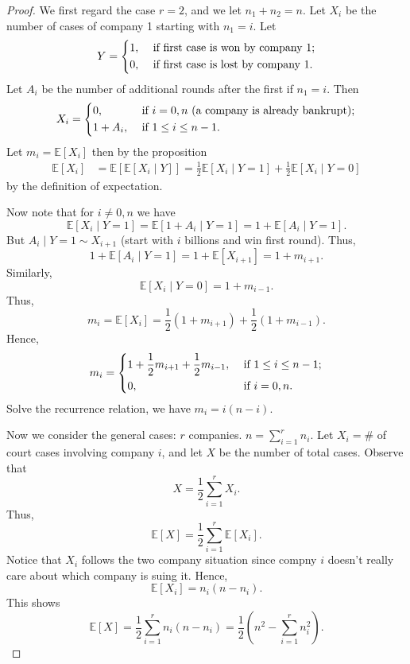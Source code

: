 \begin{proof}
    We first regard the case \(r = 2\), and we let \(n_1 + n_2 = n\). Let \(X_i\) be the number of cases of company 1 starting with \(n_1 = i\). Let 
    \[
        Y = \begin{dcases}
            1, &\text{ if first case is won by company 1}  ;\\
            0, &\text{ if first case is lost by company 1} .
        \end{dcases}
    \]
    Let \(A_i\) be the number of additional rounds after the first if \(n_1 = i\). Then 
    \[
        X_i = \begin{dcases}
            0, &\text{ if } i = 0, n \text{ (a company is already bankrupt)}  ;\\
            1 + A_i, &\text{ if } 1 \le i \le n - 1.
        \end{dcases}
    \]  
    Let \(m_i = \mathbb{E} [X_i]\)  then by the proposition 
    \begin{align*}
        \mathbb{E} [X_i] &= \mathbb{E} \left[ \mathbb{E} [X_i \mid Y] \right] = \frac{1}{2} \mathbb{E} [X_i \mid Y = 1] + \frac{1}{2} \mathbb{E} [X_i \mid Y = 0] 
    \end{align*} 
    by the definition of expectation. 

    Now note that for \(i \neq 0, n\) we have 
    \[
        \mathbb{E} [X_i \mid Y = 1] = \mathbb{E} [1 + A_i \mid Y = 1] = 1 + \mathbb{E} [A_i \mid Y = 1].
    \]
    But \(A_i \mid Y = 1 \sim X_{i + 1}\) (start with \(i\) billions and win first round). Thus,
    \[
        1 + \mathbb{E} [A_i \mid Y = 1] = 1 + \mathbb{E} [X_{i+1}] = 1 + m_{i+1}.
    \] 
    Similarly, 
    \[
        \mathbb{E} [X_i \mid Y = 0] = 1 + m_{i - 1}.
    \]
    Thus,
    \[
        m_i = \mathbb{E} [X_i] = \frac{1}{2} \left( 1 + m_{i + 1} \right) + \frac{1}{2} \left( 1 + m_{i - 1} \right).  
    \]
    Hence, 
    \[
        m_i = \begin{dcases}
            1 + \frac{1}{2} m_{i + 1} + \frac{1}{2} m_{i - 1}, &\text{ if } 1 \le i \le n - 1 ;\\
            0, &\text{ if }  i = 0, n.
        \end{dcases}
    \]
    Solve the recurrence relation, we have \(m_i = i(n - i)\).

    Now we consider the general cases: \(r\) companies. \(n = \sum_{i=1}^r n_i \). Let \(X_i = \#\) of court cases involving company \(i\), and let \(X\) be the number of total cases. Observe that 
    \[
        X = \frac{1}{2} \sum_{i=1}^r X_i. 
    \]      
    Thus,
    \[
        \mathbb{E} [X] = \frac{1}{2} \sum_{i=1}^r \mathbb{E} [X_i]. 
    \]
    Notice that \(X_i\) follows the two company situation since compny \(i\) doesn't really care about which company is suing it. Hence,
    \[
        \mathbb{E} [X_i] = n_i (n - n_i).
    \]  
    This shows 
    \[
        \mathbb{E} [X] = \frac{1}{2} \sum_{i=1}^r n_i (n - n_i) = \frac{1}{2} \left( n^2 - \sum_{i=1}^r n_i^2  \right).  
    \]
\end{proof}
